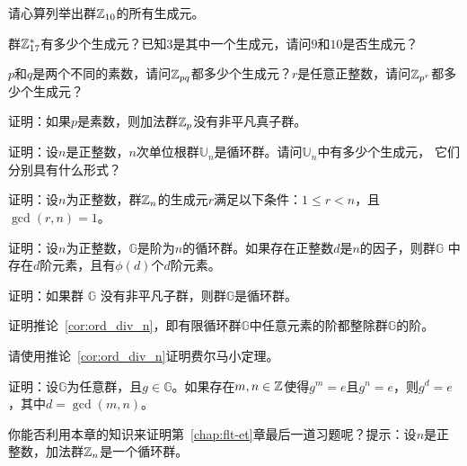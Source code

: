 \begin{problemset}
		
		\item 请心算列举出群${\mathbb Z}_{10}$的所有生成元。
		
		\item 群${\mathbb Z}_{17}^*$有多少个生成元？已知$3$是其中一个生成元，请问$9$和$10$是否生成元？%
		
		\item $p$和$q$是两个不同的素数，请问${\mathbb Z}_{pq}$都多少个生成元？$r$是任意正整数，请问${\mathbb Z}_{p^r}$都多少个生成元？
		
		\item 证明：如果$p$是素数，则加法群${\mathbb Z}_p$没有非平凡真子群。
		
		\item 证明：设$n$是正整数，$n$次单位根群$\mathbb{U}_n$是循环群。请问$\mathbb{U}_n$中有多少个生成元，
		它们分别具有什么形式？
		
		\item 证明：设$n$为正整数，群${\mathbb Z}_n$的生成元$r$满足以下条件：$1 \leq r < n$，且$\gcd(r, n)=1$。
		
		\item 证明：设$n$为正整数，$\mathbb{G}$是阶为$n$的循环群。如果存在正整数$d$是$n$的因子，则群$\mathbb{G}$
		中存在$d$阶元素，且有$\phi(d)$个$d$阶元素。%
		
		\item 证明：如果群 $\mathbb{G}$ 没有非平凡子群，则群$\mathbb{G}$是循环群。
		
		\item 证明推论~\ref{cor:ord_div_n}，即有限循环群$\mathbb{G}$中任意元素的阶都整除群$\mathbb{G}$的阶。
		
		\item 请使用推论~\ref{cor:ord_div_n}证明费尔马小定理。%
		
		\item 证明：设$\mathbb{G}$为任意群，且$g\in \mathbb{G}$。如果存在$m, n \in {\mathbb Z}$使得$g^m = e$且$g^n = e$，则$g^d = e$，其中$d = \gcd(m, n)$。
		
		\item 你能否利用本章的知识来证明第~\ref{chap:flt-et}章最后一道习题呢？提示：设$n$是正整数，加法群${\mathbb Z}_n$是一个循环群。%
		

\end{problemset}
